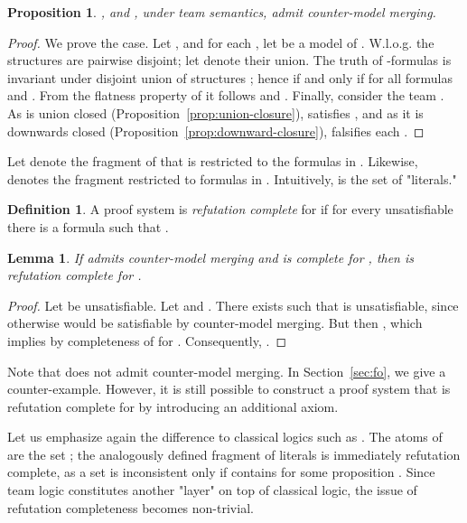\documentclass[a4paper,english,fleqn,11pt,final]{scrartcl}
\makeatletter
\newcommand{\Wloss}{W.l.o.g.\@\xspace}
\theoremstyle{plain}
\newtheorem{proposition}[theorem]{Proposition}
\newtheorem{lemma}[theorem]{Lemma}
\theoremstyle{definition}
\newtheorem{definition}[theorem]{Definition}
\makeatother
\begin{document}
\begin{proposition}\label{prop:counter-models-ml-pl}
,  and , under team semantics, admit counter-model merging.
\end{proposition}
\begin{proof}
We prove the  case.
Let , and for each , let  be a model of .
\Wloss the structures  are pairwise disjoint; let  denote their union.
The truth of -formulas is invariant under disjoint union of structures \cite{Goranko2007249}; hence  if and only if  for all formulas  and .
From the flatness property of  it follows  and .
Finally, consider the team .
As  is union closed (Proposition~\ref{prop:union-closure}),  satisfies , and as it is downwards closed (Proposition~\ref{prop:downward-closure}),  falsifies each .
\end{proof}



Let  denote the fragment of  that is restricted to the formulas in .
Likewise,  denotes the fragment restricted to formulas in .
Intuitively,  is the set of "literals."


\begin{definition}
A proof system  is \emph{refutation complete} for  if for every unsatisfiable  there is a formula  such that .
\end{definition}


\begin{lemma}\label{lem:model-existence1}
If  admits counter-model merging and  is complete for , then  is refutation complete for .
\end{lemma}
\begin{proof}
Let  be unsatisfiable.
Let  and .
There exists  such that  is unsatisfiable, since otherwise  would be satisfiable by counter-model merging.
But then , which implies  by completeness of  for .
Consequently, .
\end{proof}


Note that  does not admit counter-model merging.
In Section~\ref{sec:fo}, we give a counter-example.
However, it is still possible to construct a proof system that is refutation complete for  by introducing an additional axiom.

\medskip

Let us emphasize again the difference to classical logics such as .
The atoms of  are the set ; the analogously defined fragment  of literals is immediately refutation complete, as a set  is inconsistent only if contains  for some proposition .
Since team logic constitutes another "layer" on top of classical logic, the issue of refutation completeness becomes non-trivial.
\end{document}
